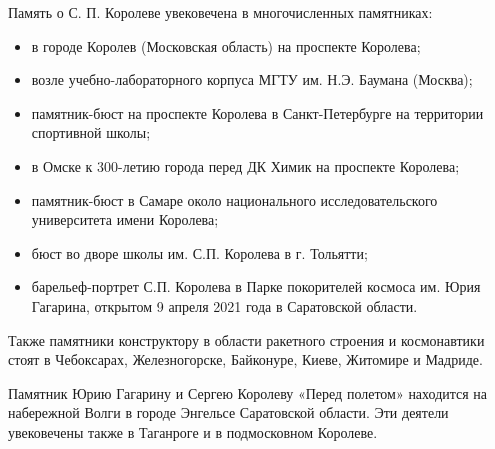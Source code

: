 Память о С. П. Королеве увековечена в многочисленных памятниках:

\begin{itemize}
  \item в городе Королев (Московская область) на проспекте Королева;
  \item возле учебно-лабораторного корпуса МГТУ им. Н.Э. Баумана (Москва);
  \item памятник-бюст на проспекте Королева в Санкт-Петербурге на территории спортивной школы;
  \item в Омске к 300-летию города перед ДК Химик на проспекте Королева;
  \item памятник-бюст в Самаре около национального исследовательского университета имени Королева;
  \item бюст во дворе школы им. С.П. Королева в г. Тольятти;
  \item барельеф-портрет С.П. Королева в Парке покорителей космоса им. Юрия Гагарина, открытом 9 апреля 2021 года в Саратовской области.
\end{itemize}

Также памятники конструктору в области ракетного строения и космонавтики стоят
в Чебоксарах, Железногорске, Байконуре, Киеве, Житомире и Мадриде.

Памятник Юрию Гагарину и Сергею Королеву «Перед полетом» находится на
набережной Волги в городе Энгельсе Саратовской области. Эти деятели увековечены
также в Таганроге и в подмосковном Королеве.
